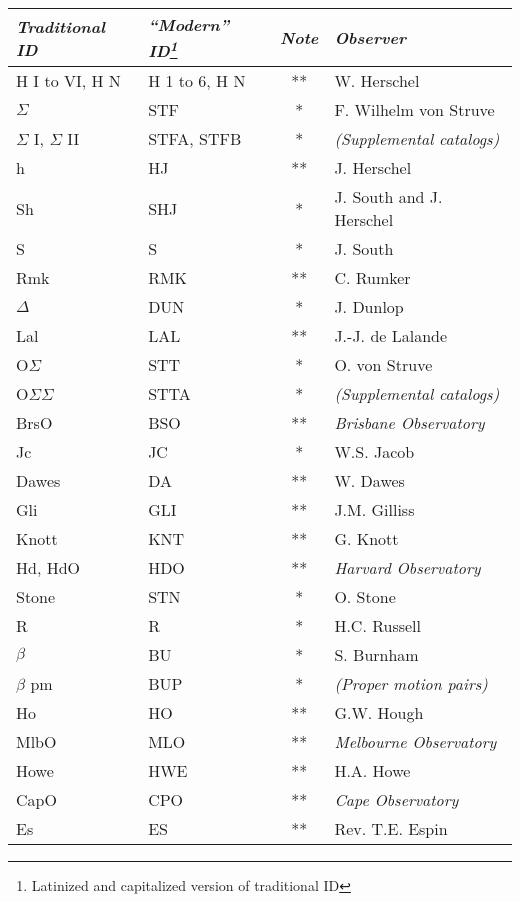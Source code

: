 \begin{longtable}{l|l|c|p{80mm}}\toprule
\emph{Traditional ID} & \emph{``Modern'' ID\footnote{Latinized and capitalized version of traditional ID}} & \emph{Note} & \emph{Observer}\\\midrule
H I to VI, H N		& H 1 to 6, H N & ** & W. Herschel \\
$\Sigma$        	& STF 	& *  & F. Wilhelm von Struve \\
$\Sigma$ I, $\Sigma$ II & STFA, STFB 	& *  & \emph{(Supplemental catalogs)} \\
h   	        	& HJ  	& ** & J. Herschel \\
Sh   	        	& SHJ 	& *  & J. South and J. Herschel \\
S  	  	            & S   	& *  & J. South \\
Rmk 	  	        & RMK 	& ** & C. Rumker \\
$\Delta$		    & DUN 	& *  & J. Dunlop \\
Lal  		        & LAL 	& ** & J.-J. de Lalande \\
O$\Sigma$       	& STT 	& *  & O. von Struve \\
O$\Sigma\Sigma$ 	& STTA 	& *  & \emph{(Supplemental catalogs)} \\
BrsO	        	& BSO 	& ** & \emph{Brisbane Observatory} \\
Jc   	        	& JC  	& *  & W.S. Jacob \\
Dawes 	        	& DA  	& ** & W. Dawes \\
Gli 	 	        & GLI 	& ** & J.M. Gilliss \\
Knott  	        	& KNT 	& ** & G. Knott \\
Hd, HdO   	        & HDO 	& ** & \emph{Harvard Observatory} \\
Stone  	       		& STN 	& *  & O. Stone \\
R   	        	& R   	& *  & H.C. Russell \\
$\beta$   			& BU  	& *  & S. Burnham \\
$\beta$ pm 			& BUP 	& *  & \emph{(Proper motion pairs)} \\
Ho   	        	& HO  	& ** & G.W. Hough \\
MlbO  	        	& MLO 	& ** & \emph{Melbourne Observatory} \\
Howe   	        	& HWE 	& ** & H.A. Howe \\
CapO	        	& CPO 	& ** & \emph{Cape Observatory} \\
Es 	 	        	& ES  	& ** & Rev. T.E. Espin \\

\end{longtable}

